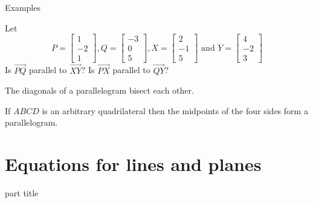 \documentclass{beamer}
\begin{document}
\begin{frame}{Examples}
  \begin{example}
    Let
    \begin{equation*}
      P = \left[
	\begin{array}{c}
          1\\
          -2\\
          1
	\end{array}
      \right], Q= \left[
	\begin{array}{c}
          -3\\
          0\\
          5
	\end{array}
      \right], X= \left[
	\begin{array}{c}
          2\\
          -1\\
          5
	\end{array}
      \right]\text{ and }Y = \left[
	\begin{array}{c}
          4\\
          -2\\
          3
	\end{array}
      \right]
    \end{equation*}
    Is $\overrightarrow {PQ}$ parallel to $\overrightarrow {XY}$? Is $\overrightarrow {PX}$ parallel to $\overrightarrow {QY}$?
  \end{example}
  \begin{example}
    The diagonals of a parallelogram bisect each other.
  \end{example}
  \begin{example}
    If $ABCD$ is an arbitrary quadrilateral then the midpoints of the four sides form a parallelogram.
  \end{example}
\end{frame}

\section{Equations for lines and planes}

\begin{frame}
  \begin{beamercolorbox}[sep=12pt,center]{part title}
    \insertsection\par
  \end{beamercolorbox}
\end{frame}
\end{document}
